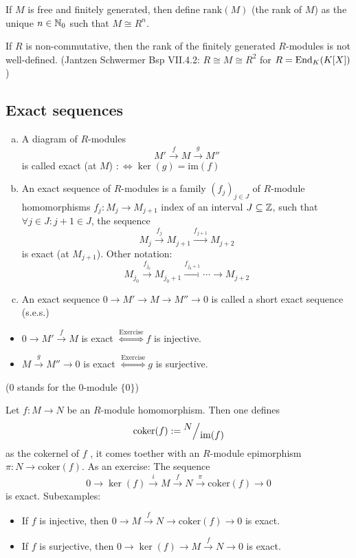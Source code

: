 \documentclass[a4paper]{report}
\begin{document}
\begin{defi}%
If $M$ is free and finitely generated, then define $\mathrm{rank}(M)$ (the rank of $M$) as the unique $n \in \mathbb{N}_0$ such that $M \cong R^{n}$.
\end{defi}

\begin{rem*}
If $R$ is non-commutative, then the rank of the finitely generated $R$-modules is not well-defined. (Jantzen Schwermer Bsp VII.4.2: $R \cong M \cong R^{2}$ for $R = \operatorname{End}_{K}(K[X])$)
\end{rem*}

\subsection{Exact sequences}
\begin{defi}
\begin{enumerate}[(a)]
  \item A diagram of $R$-modules \[M' \xrightarrow{f} M \xrightarrow{g}M''\]
        is called exact (at $M$) $:\iff \ker(g) = \mathrm{im}(f)$
  \item An exact sequence of $R$-modules is a family $(f_{j})_{j \in J}$ of $R$-module homomorphisms $f_{j}: M_{j} \to M_{j+1}$ index of an interval $J \subseteq \mathbb{Z}$, such that $\forall j \in J : j+1 \in J$, the sequence
        \[M_{j} \xrightarrow{f_{j}} M_{j+1} \xrightarrow{f_{j+1}}M_{j+2}\]
        is exact (at $M_{j+1}$). Other notation: %
        \[M_{j_{0}} \xrightarrow{f_{j_{0}}} M_{j_{0}+1} \xrightarrow{f_{j_{0}+1}} \cdots \to M_{j+2}\]
        \item An exact sequence $0 \to M' \to M \to M'' \to 0$ is called a short exact sequence (s.e.s.)
\end{enumerate}
\end{defi}

\begin{rem*}
  \begin{itemize}
  \item $0 \to M' \xrightarrow{f} M$ is exact $\overset{\text{Exercise}}\iff f$ is injective.
  \item $M \xrightarrow{g} M'' \to 0$ is exact $\overset{\text{Exercise}}\iff g$ is surjective.
  \end{itemize}
  ($0$ stands for the $0$-module $\{0\}$)
\end{rem*}
\begin{exmp}
  Let $f: M \to N$ be an $R$-module homomorphism. Then one defines
  \[\mathrm{coker}(f):= \fak N{\mathrm{im}(f)}\]
 as the cokernel of $f$ , it comes toether with an $R$-module epimorphism $\pi: N \to \mathrm{coker}(f)$. As an exercise: The sequence
  \[0 \to \ker(f) \xrightarrow{i} M \xrightarrow f N \xrightarrow \pi \mathrm{coker}(f) \to 0\]
  is exact. Subexamples:
  \begin{itemize}
    \item If $f$ is injective, then $0 \to M \xrightarrow f N \to \mathrm{coker}(f) \to 0$ is exact.
          \item If $f$ is surjective, then $0 \to \ker(f) \to M \xrightarrow f N \to 0$ is exact.
  \end{itemize}
\end{exmp}
\end{document}
